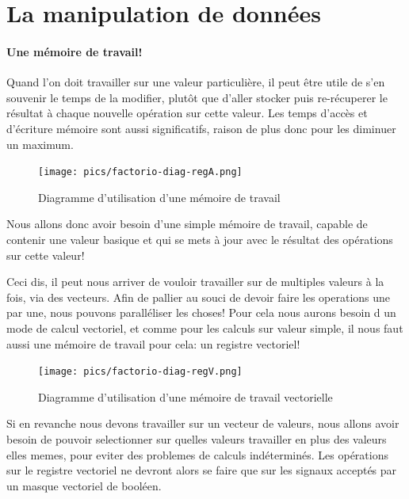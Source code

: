 \documentclass{scrreprt}
\begin{document}
	    \section{La manipulation de données}
	    
	    	\paragraph{Une mémoire de travail!}
	    	Quand l'on doit travailler sur une valeur particulière, il peut être utile de s'en souvenir le temps de la modifier, plutôt que d'aller stocker puis re-récuperer le résultat à chaque nouvelle opération sur cette valeur.
	    	Les temps d'accès et d'écriture mémoire sont aussi significatifs, raison de plus donc pour les diminuer un maximum.
	    	
	    	\begin{figure}[h]
	    		\centering
	    		\texttt{[image: pics/factorio-diag-regA.png]}
	    		
	    		\caption{Diagramme d'utilisation d'une mémoire de travail}
	    	\end{figure}
	    	
	    	Nous allons donc avoir besoin d'une simple mémoire de travail, capable de contenir une valeur basique et qui se mets à jour avec le résultat des opérations sur cette valeur!
	    	
	    	
	    	Ceci dis, il peut nous arriver de vouloir travailler sur de multiples valeurs à la fois, via des vecteurs.
	    	Afin de pallier au souci de devoir faire les operations une par une, nous pouvons paralléliser les choses! 
	    	Pour cela nous aurons besoin d un mode de calcul vectoriel, et comme pour les calculs sur valeur simple, il nous faut aussi une mémoire de travail pour cela: un registre vectoriel!
	    	
	    	\begin{figure}[h]
	    		\centering
	    		\texttt{[image: pics/factorio-diag-regV.png]}
	    		
	    		\caption{Diagramme d'utilisation d'une mémoire de travail vectorielle}
	    	\end{figure}
		    
		    Si en revanche nous devons travailler sur un vecteur de valeurs, nous allons avoir besoin de pouvoir selectionner sur quelles valeurs travailler en plus des valeurs elles memes, pour eviter des problemes de calculs indéterminés.
		    Les opérations sur le registre vectoriel ne devront alors se faire que sur les signaux acceptés par un masque vectoriel de booléen.
	    	
\end{document}
